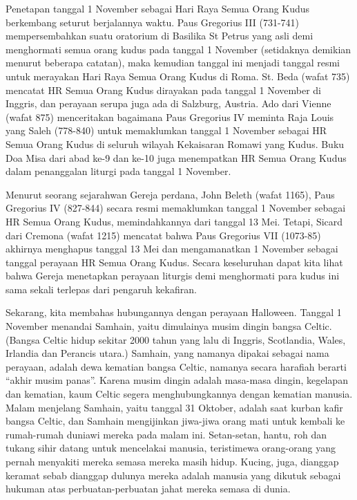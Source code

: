 Penetapan tanggal 1 November sebagai Hari Raya Semua Orang Kudus berkembang seturut berjalannya waktu. Paus Gregorius III (731-741) mempersembahkan suatu oratorium di Basilika St Petrus yang asli demi menghormati semua orang kudus pada tanggal 1 November (setidaknya demikian menurut beberapa catatan), maka kemudian tanggal ini menjadi tanggal resmi untuk merayakan Hari Raya Semua Orang Kudus di Roma. St. Beda (wafat 735) mencatat HR Semua Orang Kudus dirayakan pada tanggal 1 November di Inggris, dan perayaan serupa juga ada di Salzburg, Austria. Ado dari Vienne (wafat 875) menceritakan bagaimana Paus Gregorius IV meminta Raja Louis yang Saleh (778-840) untuk memaklumkan tanggal 1 November sebagai HR Semua Orang Kudus di seluruh wilayah Kekaisaran Romawi yang Kudus. Buku Doa Misa dari abad ke-9 dan ke-10 juga menempatkan HR Semua Orang Kudus dalam penanggalan liturgi pada tanggal 1 November.

Menurut seorang sejarahwan Gereja perdana, John Beleth (wafat 1165), Paus Gregorius IV (827-844) secara resmi memaklumkan tanggal 1 November sebagai HR Semua Orang Kudus, memindahkannya dari tanggal 13 Mei. Tetapi, Sicard dari Cremona (wafat 1215) mencatat bahwa Paus Gregorius VII (1073-85) akhirnya menghapus tanggal 13 Mei dan mengamanatkan 1 November sebagai tanggal perayaan HR Semua Orang Kudus. Secara keseluruhan dapat kita lihat bahwa Gereja menetapkan perayaan liturgis demi menghormati para kudus ini sama sekali terlepas dari pengaruh kekafiran.

Sekarang, kita membahas hubungannya dengan perayaan Halloween. Tanggal 1 November menandai Samhain, yaitu dimulainya musim dingin bangsa Celtic. (Bangsa Celtic hidup sekitar 2000 tahun yang lalu di Inggris, Scotlandia, Wales, Irlandia dan Perancis utara.) Samhain, yang namanya dipakai sebagai nama perayaan, adalah dewa kematian bangsa Celtic, namanya secara harafiah berarti “akhir musim panas”. Karena musim dingin adalah masa-masa dingin, kegelapan dan kematian, kaum Celtic segera menghubungkannya dengan kematian manusia. Malam menjelang Samhain, yaitu tanggal 31 Oktober, adalah saat kurban kafir bangsa Celtic, dan Samhain mengijinkan jiwa-jiwa orang mati untuk kembali ke rumah-rumah duniawi mereka pada malam ini. Setan-setan, hantu, roh dan tukang sihir datang untuk mencelakai manusia, teristimewa orang-orang yang pernah menyakiti mereka semasa mereka masih hidup. Kucing, juga, dianggap keramat sebab dianggap dulunya mereka adalah manusia yang dikutuk sebagai hukuman atas perbuatan-perbuatan jahat mereka semasa di dunia.

